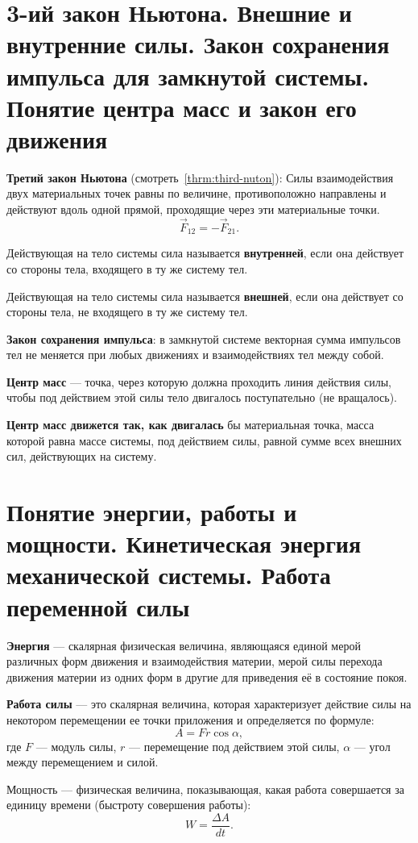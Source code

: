 \documentclass[10pt]{scrbook}
\begin{document}
\section[третий вопрос]{3-ий закон Ньютона. Внешние и внутренние силы. Закон
  сохранения импульса для замкнутой системы. Понятие центра масс и закон его
  движения}

\textbf{Третий закон Ньютона} (смотреть~\ref{thrm:third-nuton}): Силы
взаимодействия двух материальных точек равны по величине, противоположно
направлены и действуют вдоль одной прямой, проходящие через эти материальные
точки. \[
	\vec{F}_{12} = -\vec{F}_{21}
	.\]

Действующая на тело системы сила называется \textbf{внутренней}, если она
действует со стороны тела, входящего в ту же систему тел.

Действующая на тело системы сила называется \textbf{внешней}, если она
действует со стороны тела, не входящего в ту же систему тел.

\textbf{Закон сохранения импульса}: в замкнутой системе векторная сумма
импульсов тел не меняется при любых движениях и взаимодействиях тел между
собой.

\textbf{Центр масс} --- точка, через которую должна проходить линия действия
силы, чтобы под действием этой силы тело двигалось поступательно (не
вращалось).

\textbf{Центр масс движется так, как двигалась} бы материальная точка, масса
которой равна массе системы, под действием силы, равной сумме всех внешних сил,
действующих на систему.

\section[четвёртый вопрос]{Понятие энергии, работы и мощности. Кинетическая
  энергия механической системы. Работа переменной силы}

\textbf{Энергия} — скалярная физическая величина, являющаяся единой мерой
различных форм движения и взаимодействия материи, мерой силы перехода движения
материи из одних форм в другие для приведения её в состояние покоя.

\textbf{Работа силы} --- это скалярная величина, которая характеризует действие
силы на некотором перемещении ее точки приложения и определяется по формуле: \[
	A = F r \cos{\alpha}
	,\] где $F$ --- модуль силы, $r$ --- перемещение под действием этой силы,
$\alpha$ --- угол между перемещением и силой.

Мощность — физическая величина, показывающая, какая работа совершается за
единицу времени (быстроту совершения работы): \[
	W = \frac{\Delta A}{dt}
	.\]
\end{document}
